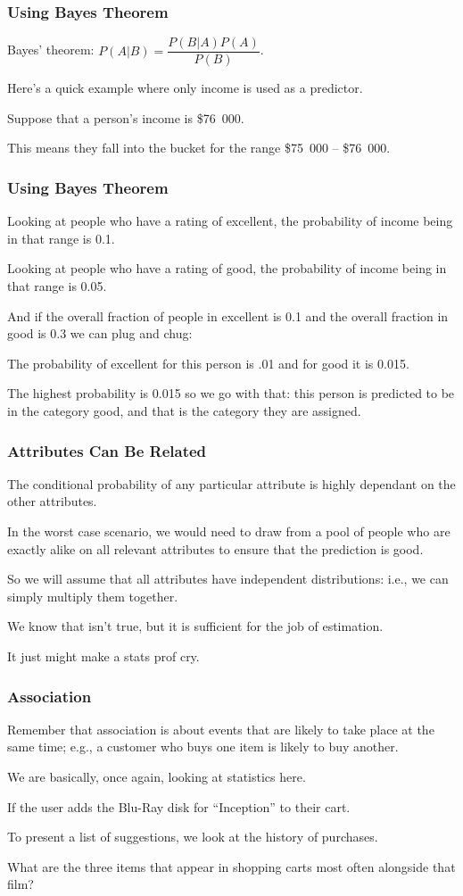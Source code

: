 \begin{frame}
\frametitle{Using Bayes Theorem}

Bayes' theorem: $P(A|B) = \dfrac{P(B|A)P(A)}{P(B)}$. 

Here's a quick example where only income is used as a predictor. 

Suppose that a person's income is \$76~000. 

This means they fall into the bucket for the range \$75~000 -- \$76~000.

\end{frame}


\begin{frame}
\frametitle{Using Bayes Theorem}

Looking at people who have a rating of excellent, the probability of income being in that range is 0.1. 

Looking at people who have a rating of good, the probability of income being in that range is 0.05.

 And if the overall fraction of people in excellent is 0.1 and the overall fraction in good is 0.3 we can plug and chug: 
 
The probability of excellent for this person is .01 and for good it is 0.015. 

The highest probability is 0.015 so we go with that: this person is predicted to be in the category good, and that is the category they are assigned.

\end{frame}

\begin{frame}
\frametitle{Attributes Can Be Related}

The conditional probability of any particular attribute is highly dependant on the other attributes. 

In the worst case scenario, we would need to draw from a pool of people who are exactly alike on all relevant attributes to ensure that the prediction is good.

So we will assume that all attributes have independent distributions: i.e., we can simply multiply them together. 

We know that isn't true, but it is sufficient for the job of estimation. 

It just might make a stats prof cry.

\end{frame}

\begin{frame}
\frametitle{Association}

Remember that association is about events that are likely to take place at the same time; e.g., a customer who buys one item is likely to buy another. 

We are basically, once again, looking at statistics here. 

If the user adds the Blu-Ray disk for ``Inception'' to their cart. 

To present a list of suggestions, we look at the history of purchases. 

What are the three items that appear in shopping carts most often alongside that film?

\end{frame}

